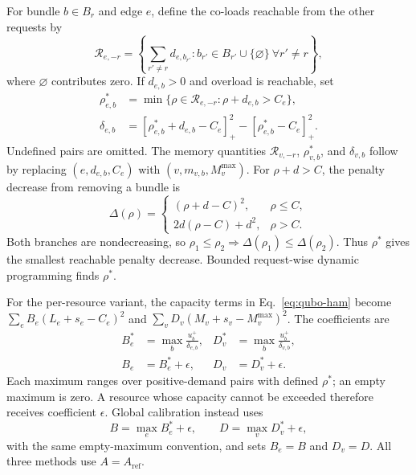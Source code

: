 \documentclass[twocolumn]{article}
\begin{document}
For bundle $b\in B_r$ and edge $e$, define the co-loads reachable from
the other requests by
\begin{equation}
  \mathcal R_{e,-r}=
  \left\{\sum_{r'\ne r}d_{e,b_{r'}}:
    b_{r'}\in B_{r'}\cup\{\varnothing\}\ \forall r'\ne r\right\},
  \label{eq:reachable-loads}
\end{equation}
where $\varnothing$ contributes zero.  If $d_{e,b}>0$ and overload is
reachable, set
\begin{align}
  \rho^*_{e,b}
    &=\min\{\rho\in\mathcal R_{e,-r}:\rho+d_{e,b}>C_e\},\\
  \delta_{e,b}
    &=[\rho^*_{e,b}+d_{e,b}-C_e]_+^2
      -[\rho^*_{e,b}-C_e]_+^2.
  \label{eq:edge-penalty-drop}
\end{align}
Undefined pairs are omitted.  The memory quantities
$\mathcal R_{v,-r}$, $\rho^*_{v,b}$, and $\delta_{v,b}$ follow by
replacing $(e,d_{e,b},C_e)$ with $(v,m_{v,b},M_v^{\max})$.
For $\rho+d>C$, the penalty decrease from removing a bundle is
\begin{equation}
  \Delta(\rho)=
  \begin{cases}
    (\rho+d-C)^2, & \rho\le C,\\
    2d(\rho-C)+d^2, & \rho>C.
  \end{cases}
  \label{eq:drop-monotonicity}
\end{equation}
Both branches are nondecreasing, so
$\rho_1\le\rho_2\Rightarrow\Delta(\rho_1)\le\Delta(\rho_2)$.
Thus $\rho^*$ gives the smallest reachable penalty decrease.  Bounded
request-wise dynamic programming finds $\rho^*$.

For the per-resource variant, the capacity terms in
Eq.~\eqref{eq:qubo-ham} become
$\sum_e B_e(L_e+s_e-C_e)^2$ and
$\sum_v D_v(M_v+s_v-M_v^{\max})^2$.
The coefficients are
\begin{align}
  B_e^*&=\max_b\frac{u_b^+}{\delta_{e,b}}, &
  D_v^*&=\max_b\frac{u_b^+}{\delta_{v,b}},\\
  B_e&=B_e^*+\epsilon, &
  D_v&=D_v^*+\epsilon.
  \label{eq:per-resource-calibration}
\end{align}
Each maximum ranges over positive-demand pairs with defined
$\rho^*$; an empty maximum is zero.  A resource whose capacity
cannot be exceeded therefore receives coefficient $\epsilon$.
Global calibration instead uses
\begin{equation}
  B=\max_e B_e^*+\epsilon,\qquad
  D=\max_v D_v^*+\epsilon,
  \label{eq:reachable-calibration}
\end{equation}
with the same empty-maximum convention, and sets $B_e=B$ and
$D_v=D$.  All three methods use $A=A_{\mathrm{ref}}$.
\end{document}
